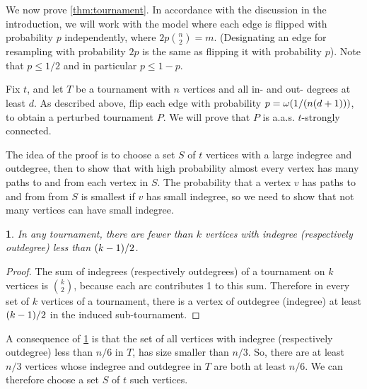 \documentclass[11pt,english]{article}
\theoremstyle{plain}
\theoremstyle{definition}
\theoremstyle{definition}
\theoremstyle{plain}
\theoremstyle{plain}
\theoremstyle{plain}
\newtheorem{lem}[thm]{\protect\lemmaname}
\theoremstyle{plain}
\theoremstyle{remark}
\theoremstyle{remark}
\let\originalleft\left
\let\originalright\right
\renewcommand{\left}{\mathopen{}\mathclose\bgroup\originalleft}
\renewcommand{\right}{\aftergroup\egroup\originalright}
\providecommand{\lemmaname}{Lemma}
\begin{document}
We now prove \ref{thm:tournament}. In accordance with the discussion
in the introduction, we will work with the model where each edge is
flipped with probability $p$ independently, where $2p{n \choose 2}=m$.
(Designating an edge for resampling with probability $2p$ is the
same as flipping it with probability $p$). Note that $p\le1/2$ and in particular $p\le1-p$.

Fix $t$, and let $T$ be a tournament with $n$ vertices
and all in- and out- degrees at least $d$. As described above, flip each edge with probability $p=\omega\left(1/\left(n\left(d+1\right)\right)\right)$, to obtain a perturbed tournament $P$. We will prove that $P$ is a.a.s.{} $t$-strongly connected.

The idea of the proof is to choose a set $S$ of $t$ vertices with a
large indegree and outdegree, then to show that with high probability
almost every vertex has many paths to and from each vertex in $S$.
The probability that a vertex $v$ has paths to and from from $S$ is smallest
if $v$ has small indegree, so we need to show that not many vertices
can have small indegree.
\begin{lem}
\label{lem:extreme-indegree-bound}In any tournament, there are fewer
than $k$ vertices with indegree (respectively outdegree) less than
$\left(k-1\right)/2$.\end{lem}
\begin{proof}
The sum of indegrees (respectively outdegrees) of a tournament on
$k$ vertices is ${k \choose 2}$, because each arc contributes 1
to this sum. Therefore in every set of $k$ vertices of a tournament,
there is a vertex of outdegree (indegree) at least $\left(k-1\right)/2$
in the induced sub-tournament.
\end{proof}
A consequence of \ref{lem:extreme-indegree-bound} is that the set
of all vertices with indegree (respectively outdegree) less than $n/6$
in $T$, has size smaller than $n/3$. So, there are at least $n/3$ vertices
whose indegree and outdegree in $T$ are both at least $n/6$. We can therefore choose
a set $S$ of $t$ such vertices.
\end{document}
